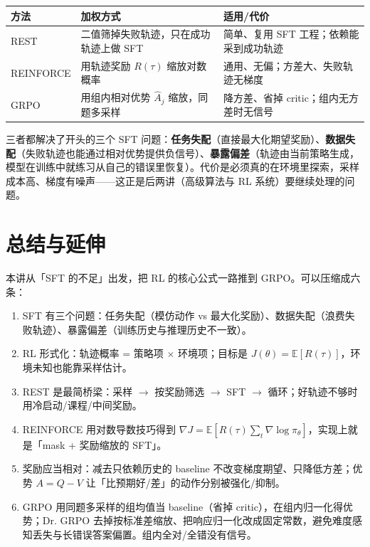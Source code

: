\documentclass[a4paper]{article}
\begin{document}
\begin{center}
\begin{tabular}{p{2.8cm}p{5.2cm}p{5.2cm}}
\toprule
方法 & 加权方式 & 适用/代价 \\
\midrule
REST & 二值筛掉失败轨迹，只在成功轨迹上做 SFT & 简单、复用 SFT 工程；依赖能采到成功轨迹 \\
REINFORCE & 用轨迹奖励 $R(\tau)$ 缩放对数概率 & 通用、无偏；方差大、失败轨迹无梯度 \\
GRPO & 用组内相对优势 $\hat A_j$ 缩放，同题多采样 & 降方差、省掉 critic；组内无方差时无信号 \\
\bottomrule
\end{tabular}
\end{center}

三者都解决了开头的三个 SFT 问题：\textbf{任务失配}（直接最大化期望奖励）、\textbf{数据失配}（失败轨迹也能通过相对优势提供负信号）、\textbf{暴露偏差}（轨迹由当前策略生成，模型在训练中就练习从自己的错误里恢复）。代价是必须真的在环境里探索，采样成本高、梯度有噪声——这正是后两讲（高级算法与 RL 系统）要继续处理的问题。

\section{总结与延伸}

本讲从「SFT 的不足」出发，把 RL 的核心公式一路推到 GRPO。可以压缩成六条：

\begin{enumerate}
\item SFT 有三个问题：任务失配（模仿动作 vs 最大化奖励）、数据失配（浪费失败轨迹）、暴露偏差（训练历史与推理历史不一致）。
\item RL 形式化：轨迹概率 = 策略项 $\times$ 环境项；目标是 $J(\theta)=\mathbb{E}[R(\tau)]$，环境未知也能靠采样估计。
\item REST 是最简桥梁：采样 $\rightarrow$ 按奖励筛选 $\rightarrow$ SFT $\rightarrow$ 循环；好轨迹不够时用冷启动/课程/中间奖励。
\item REINFORCE 用对数导数技巧得到 $\nabla J=\mathbb{E}[R(\tau)\sum_t\nabla\log\pi_\theta]$，实现上就是「mask + 奖励缩放的 SFT」。
\item 奖励应当相对：减去只依赖历史的 baseline 不改变梯度期望、只降低方差；优势 $A=Q-V$ 让「比预期好/差」的动作分别被强化/抑制。
\item GRPO 用同题多采样的组均值当 baseline（省掉 critic），在组内归一化得优势；Dr. GRPO 去掉按标准差缩放、把响应归一化改成固定常数，避免难度感知丢失与长错误答案偏置。组内全对/全错没有信号。
\end{enumerate}
\end{document}
